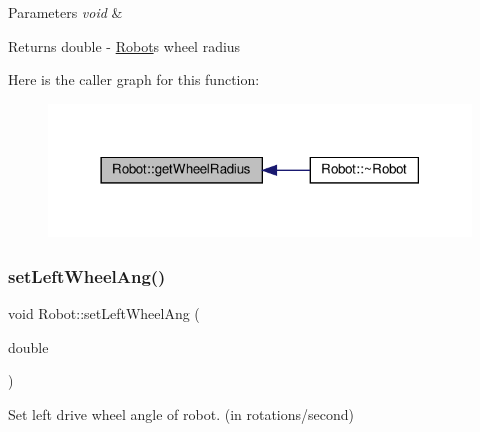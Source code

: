 \begin{DoxyParams}{Parameters}
{\em void} & \\
\hline
\end{DoxyParams}
\begin{DoxyReturn}{Returns}
double -\/ \hyperlink{classRobot}{Robot}\textquotesingle{}s wheel radius 
\end{DoxyReturn}
Here is the caller graph for this function\+:
\nopagebreak
\begin{figure}[H]
\begin{center}
\leavevmode
\includegraphics[width=318pt]{classRobot_a419b324c8db1f6e7e1dd65b5a15f3049_icgraph}
\end{center}
\end{figure}
\mbox{\label{classRobot_adbe4d758d302d3fa70fedf5af9c82afc}} 
\subsubsection{\texorpdfstring{set\+Left\+Wheel\+Ang()}{setLeftWheelAng()}}
{\footnotesize\ttfamily void Robot\+::set\+Left\+Wheel\+Ang (\begin{DoxyParamCaption}\item[{double}]{ }\end{DoxyParamCaption})}



Set left drive wheel angle of robot. (in rotations/second) 


